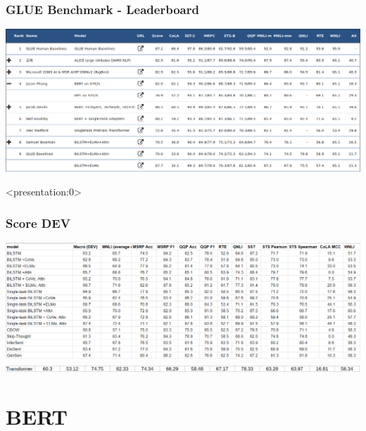 \documentclass{beamer}
\begin{document}
\begin{frame}
    \frametitle{GLUE Benchmark - Leaderboard}
    \begin{center}
        \includegraphics[scale=0.9]{img/glue_leaderboard.png}
    \end{center}
\end{frame}

\begin{frame}<presentation:0>
    \frametitle{Score DEV}
    \begin{center}
        \includegraphics[scale=0.22]{img/glue_dev.png}
        \includegraphics[scale=1.132]{img/glue_my.png}
    \end{center}
\end{frame}


\section{BERT}
\end{document}
